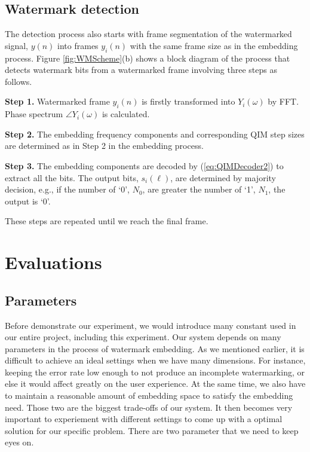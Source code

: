 \subsection{Watermark detection}
The detection process also starts with frame segmentation of the watermarked signal, \(y(n)\) into frames \(y_i(n)\) with the same frame size as in the embedding process. Figure \ref{fig:WMScheme}(b) shows a block diagram of the process that detects watermark bits from a watermarked frame involving three steps as follows.

\textbf{Step 1.} Watermarked frame \(y_i(n)\) is firstly transformed into $Y_i(\omega)$ by FFT. Phase spectrum $\angle Y_i(\omega)$ is calculated.

\textbf{Step 2.} The embedding frequency components and corresponding QIM step sizes are determined as in Step 2 in the embedding process.

\textbf{Step 3.} The embedding components are decoded by (\ref{eq:QIMDecoder2}) to extract all the bits. The output bits, $s_i(\ell)$, are determined by majority decision, e.g., if the number of `0', $N_0$, are greater the number of `1', $N_1$, the output is `0'.

These steps are repeated until we reach the final frame.

\section{Evaluations}
\subsection{Parameters}
Before demonstrate our experiment, we would introduce many constant used in our entire project, including this experiment. Our system depends on many parameters in the process of watermark embedding. As we mentioned earlier, it is difficult to achieve an ideal settings when we have many dimensions. For instance, keeping the error rate low enough to not produce an incomplete watermarking, or else it would affect greatly on the user experience. At the same time, we also have to maintain a reasonable amount of embedding space to satisfy the embedding need. Those two are the biggest trade-offs of our system. It then becomes very important to experiement with different settings to come up with a optimal solution for our specific problem. There are two parameter that we need to keep eyes on.

